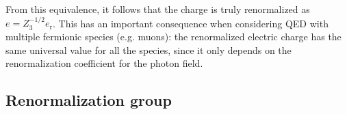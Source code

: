 
From this equivalence, it follows that the charge is truly renormalized as $ e = Z_3^{-1/2} e_\text{r} $. This has an important consequence when considering QED with multiple fermionic species (e.g. muons): the renormalized electric charge has the same universal value for all the species, since it only depends on the renormalization coefficient for the photon field.

\subsection{Renormalization group}

